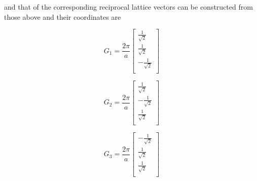 \documentclass[a4paper]{article}
\begin{document}
    and that of the corresponding reciprocal lattice vectors can be constructed from those above and their coordinates are \\
    \begin{minipage}{0.3\textwidth}
        \centering
        \begin{equation*}
        G_1 = \frac{2\pi}{a}
        \begin{bmatrix}
            \frac{1}{\sqrt{2}} \\
            \frac{1}{\sqrt{2}} \\
            -\frac{1}{\sqrt{2}} \\
            
        \end{bmatrix}
        \end{equation*}
        
        \end{minipage}
        \begin{minipage}{0.3\textwidth}
        \centering
        \begin{equation*}
        G_2 = \frac{2\pi}{a}
        \begin{bmatrix}
            \frac{1}{\sqrt{2}} \\
            -\frac{1}{\sqrt{2}} \\
            \frac{1}{\sqrt{2}} \\
            
        \end{bmatrix}
        \end{equation*}
        \end{minipage}
        \begin{minipage}{0.3\textwidth}
        \centering
        \begin{equation*}
        G_3 = \frac{2\pi}{a}
        \begin{bmatrix}
            -\frac{1}{\sqrt{2}} \\
            \frac{1}{\sqrt{2}} \\
            \frac{1}{\sqrt{2}} \\
        
        \end{bmatrix}
        \end{equation*}
        \end{minipage}
    
\end{document}
